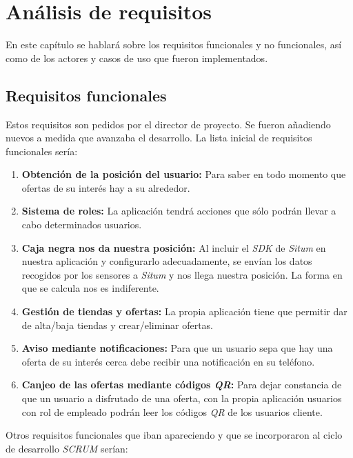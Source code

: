 \chapter{Análisis de requisitos}
En este capítulo se hablará sobre los requisitos funcionales y no funcionales, así como de los actores y casos de uso que fueron implementados.
\section{Requisitos funcionales}
Estos requisitos son pedidos por el director de proyecto. Se fueron añadiendo nuevos a medida que avanzaba el desarrollo. La lista inicial de requisitos funcionales sería:
\begin{enumerate}
\item \textbf{Obtención de la posición del usuario:} Para saber en todo momento que ofertas de su interés hay a su alrededor.
\item \textbf{Sistema de roles:} La aplicación tendrá acciones que sólo podrán llevar a cabo determinados usuarios.
\item \textbf{Caja negra nos da nuestra posición:} Al incluir el \textit{SDK} de \textit{Situm} en nuestra aplicación y configurarlo adecuadamente, se envían los datos recogidos por los sensores a \textit{Situm} y nos llega nuestra posición. La forma en que se calcula nos es indiferente.
\item \textbf{Gestión de tiendas y ofertas:} La propia aplicación tiene que permitir dar de alta/baja tiendas y crear/eliminar ofertas.
\item \textbf{Aviso mediante notificaciones:} Para que un usuario sepa que hay una oferta de su interés cerca debe recibir una notificación en su teléfono.
\item \textbf{Canjeo de las ofertas mediante códigos \textit{QR}:} Para dejar constancia de que un usuario a disfrutado de una oferta, con la propia aplicación usuarios con rol de empleado podrán leer los códigos \textit{QR} de los usuarios cliente.
\end{enumerate}
Otros requisitos funcionales que iban apareciendo y que se incorporaron al ciclo de desarrollo \textit{SCRUM} serían:
